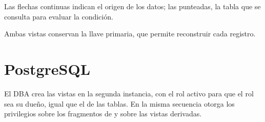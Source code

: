 Las flechas continuas indican el origen de los datos; las punteadas, la tabla que se consulta para evaluar la condición.

Ambas vistas conservan la llave primaria, que permite reconstruir cada registro.

\section{PostgreSQL}

El DBA crea las vistas en la segunda instancia, con el rol  activo para que el rol sea su dueño, igual que el de las tablas. En la misma secuencia otorga los privilegios sobre los fragmentos de  y sobre las vistas derivadas.

